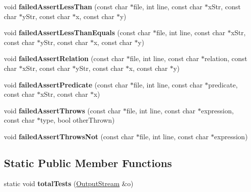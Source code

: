\begin{DoxyCompactItemize}
\item 
\hypertarget{classCxxTest_1_1UNIXErrorFormatter_af69af3c92d7b511f27373e6c5a3f269d}{void {\bfseries failed\-Assert\-Less\-Than} (const char $\ast$file, int line, const char $\ast$x\-Str, const char $\ast$y\-Str, const char $\ast$x, const char $\ast$y)}\label{classCxxTest_1_1UNIXErrorFormatter_af69af3c92d7b511f27373e6c5a3f269d}

\item 
\hypertarget{classCxxTest_1_1UNIXErrorFormatter_a9e01a34d19a0fc56f64f705198317128}{void {\bfseries failed\-Assert\-Less\-Than\-Equals} (const char $\ast$file, int line, const char $\ast$x\-Str, const char $\ast$y\-Str, const char $\ast$x, const char $\ast$y)}\label{classCxxTest_1_1UNIXErrorFormatter_a9e01a34d19a0fc56f64f705198317128}

\item 
\hypertarget{classCxxTest_1_1UNIXErrorFormatter_a523e5efccfc20522ae3f936fca99cf71}{void {\bfseries failed\-Assert\-Relation} (const char $\ast$file, int line, const char $\ast$relation, const char $\ast$x\-Str, const char $\ast$y\-Str, const char $\ast$x, const char $\ast$y)}\label{classCxxTest_1_1UNIXErrorFormatter_a523e5efccfc20522ae3f936fca99cf71}

\item 
\hypertarget{classCxxTest_1_1UNIXErrorFormatter_a867b14eeacf0f468a8541dd580d951ed}{void {\bfseries failed\-Assert\-Predicate} (const char $\ast$file, int line, const char $\ast$predicate, const char $\ast$x\-Str, const char $\ast$x)}\label{classCxxTest_1_1UNIXErrorFormatter_a867b14eeacf0f468a8541dd580d951ed}

\item 
\hypertarget{classCxxTest_1_1UNIXErrorFormatter_ab13c7674a4bdc819bd9c10a4f9174cc0}{void {\bfseries failed\-Assert\-Throws} (const char $\ast$file, int line, const char $\ast$expression, const char $\ast$type, bool other\-Thrown)}\label{classCxxTest_1_1UNIXErrorFormatter_ab13c7674a4bdc819bd9c10a4f9174cc0}

\item 
\hypertarget{classCxxTest_1_1UNIXErrorFormatter_ab196d9c2037e39ab4ace9b470e94b461}{void {\bfseries failed\-Assert\-Throws\-Not} (const char $\ast$file, int line, const char $\ast$expression)}\label{classCxxTest_1_1UNIXErrorFormatter_ab196d9c2037e39ab4ace9b470e94b461}

\end{DoxyCompactItemize}
\subsection*{Static Public Member Functions}
\begin{DoxyCompactItemize}
\item 
\hypertarget{classCxxTest_1_1UNIXErrorFormatter_a46047f7872f93229d3e9ec878d49b2e5}{static void {\bfseries total\-Tests} (\hyperlink{classCxxTest_1_1OutputStream}{Output\-Stream} \&o)}\label{classCxxTest_1_1UNIXErrorFormatter_a46047f7872f93229d3e9ec878d49b2e5}

\end{DoxyCompactItemize}
